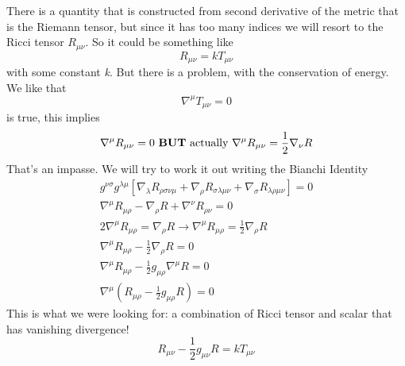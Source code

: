 There is a quantity that is constructed from second derivative of the metric that is the Riemann tensor, but since it has too many indices we will resort to the Ricci tensor $R_{\mu \nu }$. So it could be something like
\[
R_{\mu \nu } = k T_{\mu \nu }
\]
with some constant \emph{k}. But there is a problem, with the conservation of energy. We like that 
\[
\nabla ^{\mu }T_{\mu \nu } = 0
\]
is true, this implies
\[
\nabla ^{\mu }R_{\mu \nu } = 0 \text{ \textbf{BUT} actually  } \nabla^{\mu }R_{\mu \nu } = \frac{1}{2}\nabla _{\nu }R
\]
That's an impasse. We will try to work it out writing the Bianchi Identity
\begin{gather*}
	g^{\nu \sigma }g^{\lambda \mu } \left[ \nabla _{\lambda }R_{\rho \sigma \nu \mu } + \nabla _{\rho }R_{\sigma \lambda \mu \nu } + \nabla _{\sigma }R_{\lambda \rho \mu \nu }\right] =0 \\
	\nabla ^{\mu }R_{\mu \rho }- \nabla _{\rho }R	+ \nabla ^{\nu }R_{\rho \nu } =0\\
	2\nabla ^{\mu }R_{\mu \rho } = \nabla _{\rho }R \to \nabla^{\mu }R_{\mu \rho } = \frac{1}{2} \nabla _{\rho }R \\
	\nabla ^{\mu }R_{\mu \rho } - \frac{1}{2} \nabla _{\rho }R = 0 \\
	\nabla ^{\mu }R_{\mu \rho } - \frac{1}{2} g_{\mu \rho } \nabla ^{\mu }R = 0 \\
	\nabla ^{\mu } \left( R_{\mu \rho } - \frac{1}{2} g_{\mu \rho }R \right) = 0
\end{gather*}
This is what we were looking for: a combination of Ricci tensor and scalar that has vanishing divergence!
\begin{equation}
R_{\mu \nu } - \frac{1}{2}g_{\mu \nu }R = k T_{\mu \nu }
\end{equation}
















